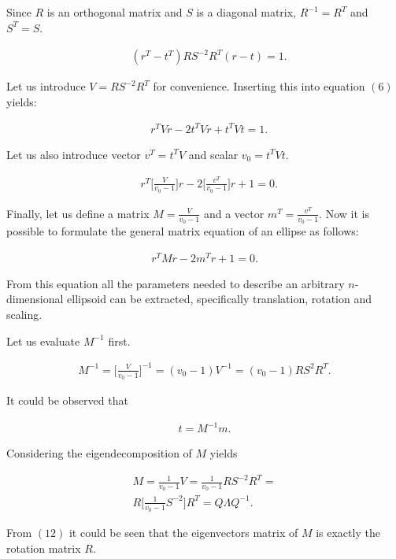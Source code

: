 Since $R$ is an orthogonal matrix and $S$ is a diagonal matrix, $R^{-1} = R^T$ and $S^T = S$.

\begin{align}
  & (r^T - t^T) R S^{-2} R^T (r -t) = 1. \tag{6}
\end{align}

Let us introduce $V = R S^{-2} R^T$ for convenience.
Inserting this into equation $(6)$ yields:

\begin{align}
  & r^T V r - 2t^T V r + t^T V t = 1. \tag{7}
\end{align}

Let us also introduce vector $v^T = t^T V$ and scalar $v_0 = t^TVt$.

\begin{align}
  & r^T \bigg[\frac{V}{v_0-1}\bigg] r - 2 \bigg[\frac{v^T}{v_0-1} \bigg] r + 1 = 0. \tag{8}
\end{align}

Finally, let us define a matrix $M = \frac{V}{v_0-1}$ and a vector $m^T = \frac{v^T}{v_0-1}$.
Now it is possible to formulate the general matrix equation of an ellipse as follows:

\begin{align}
  r^T M r - 2 m^T r + 1 = 0.
\tag{9}
\end{align}

From this equation all the parameters needed to describe an arbitrary $n$-dimensional ellipsoid can be extracted, specifically translation, rotation and scaling.

Let us evaluate $M^{-1}$ first.

\begin{align}
M^{-1} = \bigg[\frac{V}{v_0-1}\bigg]^{-1} = (v_0-1)V^{-1} = (v_0-1)RS^2R^T.
\tag{10}
\end{align}

It could be observed that

\begin{align}
 t = M^{-1}m.
\tag{11}
\end{align}

Considering the eigendecomposition of $M$ yields

\begin{align*}
  M = \frac{1}{v_0-1} V = \frac{1}{v_0-1} R S^{-2} R^T = \\
  R\bigg[\frac{1}{v_0-1} S^{-2} \bigg] R^T = Q \Lambda Q^{-1}.
\tag{12}
\end{align*}

From $(12)$ it could be seen that the eigenvectors matrix of $M$ is exactly the rotation matrix $R$.

